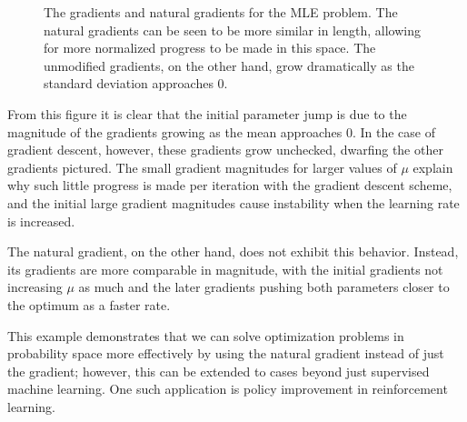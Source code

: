 \documentclass[twoside,10pt]{article}
\begin{document}
\begin{figure}[H]
  \centering
  \caption{The gradients and natural gradients for the MLE problem. The natural gradients can be seen to be more similar in length, allowing for more normalized progress to be made in this space. The unmodified gradients, on the other hand, grow dramatically as the standard deviation approaches 0.}
  \label{fig:MLE-grads}
\end{figure}

From this figure it is clear that the initial parameter jump is due to the magnitude of the gradients growing as the mean approaches 0. In the case of gradient descent, however, these gradients grow unchecked, dwarfing the other gradients pictured. The small gradient magnitudes for larger values of $\mu$ explain why such little progress is made per iteration with the gradient descent scheme, and the initial large gradient magnitudes cause instability when the learning rate is increased.

The natural gradient, on the other hand, does not exhibit this behavior. Instead, its gradients are more comparable in magnitude, with the initial gradients not increasing $\mu$ as much and the later gradients pushing both parameters closer to the optimum as a faster rate.

This example demonstrates that we can solve optimization problems in probability space more effectively by using the natural gradient instead of just the gradient; however, this can be extended to cases beyond just supervised machine learning. One such application is policy improvement in reinforcement learning.
\end{document}
